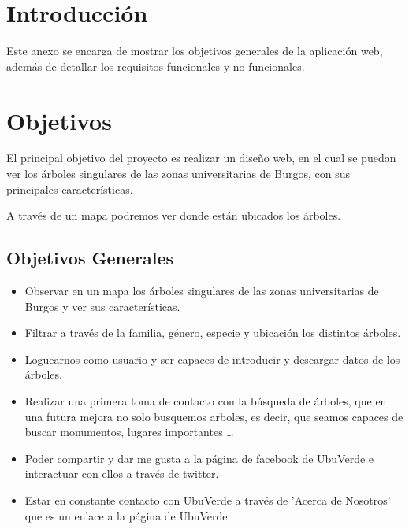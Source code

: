 
\section{Introducción}
Este anexo se encarga de mostrar los objetivos generales de la aplicación web, además de detallar los requisitos funcionales y no funcionales.

\section{Objetivos}
	El principal objetivo del proyecto es realizar un diseño web, en el cual se puedan ver los árboles singulares de las zonas universitarias de Burgos, con sus principales características.

	A través de un mapa podremos ver donde están ubicados los árboles. 
	\subsection{Objetivos Generales}
		\begin{itemize}
			\item Observar en un mapa los árboles singulares de las zonas universitarias de Burgos y ver sus características.
			\item Filtrar a través de la familia, género, especie y ubicación los distintos árboles.
			\item Loguearnos como usuario y ser capaces de introducir y descargar datos de los árboles.
			\item Realizar una primera toma de contacto con la búsqueda de árboles, que en una futura mejora no solo busquemos arboles, es decir, que seamos capaces de buscar monumentos, lugares importantes \ldots
			\item Poder compartir y dar me gusta a la página de facebook de UbuVerde e interactuar con ellos a través de twitter. 
			\item Estar en constante contacto con UbuVerde a través de 'Acerca de Nosotros' que es un enlace a la página de UbuVerde.
		\end{itemize}

